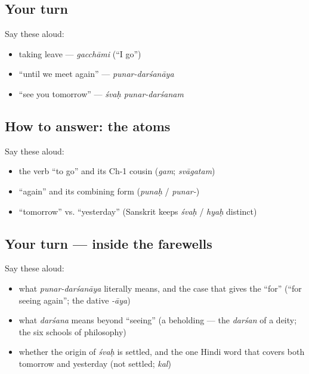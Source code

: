 \subsection*{Your turn}
Say these aloud:

\begin{itemize}
\raggedright
  \item taking leave — \emph{gacchāmi} (\textquotedblleft{}I go\textquotedblright{})
  \item \textquotedblleft{}until we meet again\textquotedblright{} — \emph{punar-darśanāya}
  \item \textquotedblleft{}see you tomorrow\textquotedblright{} — \emph{śvaḥ punar-darśanam}
\end{itemize}

\subsection*{How to answer: the atoms}
Say these aloud:

\begin{itemize}
\raggedright
  \item the verb \textquotedblleft{}to go\textquotedblright{} and its Ch-1 cousin (\emph{gam}; \emph{svāgatam})
  \item \textquotedblleft{}again\textquotedblright{} and its combining form (\emph{punaḥ} / \emph{punar-})
  \item \textquotedblleft{}tomorrow\textquotedblright{} vs. \textquotedblleft{}yesterday\textquotedblright{} (Sanskrit keeps \emph{śvaḥ} / \emph{hyaḥ} distinct)
\end{itemize}

\subsection*{Your turn — inside the farewells}
Say these aloud:

\begin{itemize}
\raggedright
  \item what \emph{punar-darśanāya} literally means, and the case that gives the \textquotedblleft{}for\textquotedblright{} (\textquotedblleft{}for seeing again\textquotedblright{}; the dative \emph{-āya})
  \item what \emph{darśana} means beyond \textquotedblleft{}seeing\textquotedblright{} (a beholding — the \emph{darśan} of a deity; the six schools of philosophy)
  \item whether the origin of \emph{śvaḥ} is settled, and the one Hindi word that covers both tomorrow and yesterday (not settled; \emph{kal})
\end{itemize}

